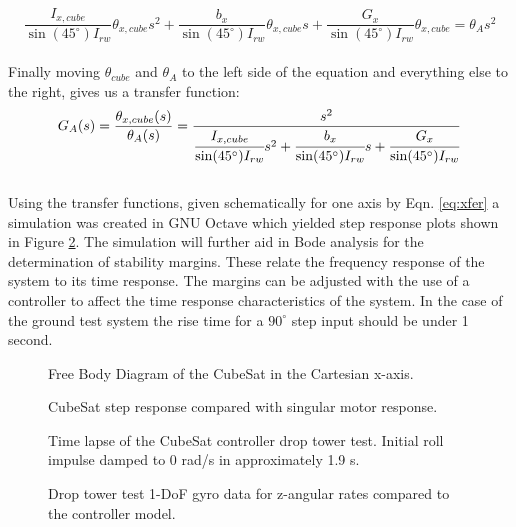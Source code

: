 \documentclass[]{aiaa-tc}%
\begin{document}
\[
\frac{I_{x,cube}}{\sin(45^{\circ}) I_{rw}} \theta_{x,cube} s^2 +
\frac{b_x}{\sin(45^{\circ}) I_{rw}} \theta_{x,cube} s +
\frac{G_x}{\sin(45^{\circ}) I_{rw}} \theta_{x,cube} = \theta_A s^2
\]\\
	
Finally moving $\theta_{cube}$ and $\theta_A$ to the left side of the equation and everything else to the right, gives us a transfer function:\\

\begin{equation}
\label{eq:xfer}
G_A(s)=\frac{\theta_{x,cube}(s)}{\theta_A(s)}=\frac{s^2}{\cfrac{I_{x,cube}}{\sin(45^{\circ}) I_{rw}}s^2 + \cfrac{b_x}{\sin(45^{\circ}) I_{rw}}s + \cfrac{G_x}{\sin(45^{\circ}) I_{rw}}}
\end{equation}\\
	
Using the transfer functions, given schematically for one axis by Eqn. \ref{eq:xfer} a simulation was created in GNU Octave which yielded step response plots shown in Figure \ref{fig:simulation}. The simulation will further aid in Bode analysis for the determination of stability margins. These relate the frequency response of the system to its time response. The margins can be adjusted with the use of a controller to affect the time response characteristics of the system. In the case of the ground test system the rise time for a $90^{\circ}$ step input should be under 1 second. 
\begin{figure}[h!]
  \centering
  
  \caption{Free Body Diagram of the CubeSat in the Cartesian x-axis.}
  \label{fig:FBD}
\end{figure}

\begin{figure}[h!]
  \centering
  {\footnotesize }
  \caption{CubeSat step response compared with singular motor response.}
  \label{fig:simulation}
\end{figure}

\begin{figure}[!ht]
 \centering
 {}
 \caption{Time lapse of the CubeSat controller drop tower test. Initial roll impulse damped to 0 rad/s in approximately 1.9 s.}
 \label{fig:lapse}
\end{figure}

\begin{figure}[!ht]
 \centering
 {\footnotesize }
 \caption{Drop tower test 1-DoF gyro data for z-angular rates compared to the controller model.}
 \label{fig:drop_results}
\end{figure}
\end{document}
